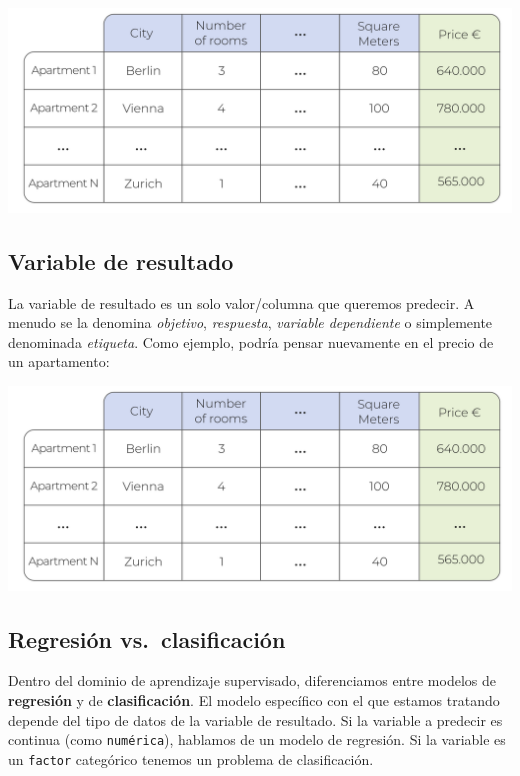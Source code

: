 \documentclass[
]{book}
\begin{document}
\includegraphics{img/tab1.png}

\hypertarget{variable-de-resultado}{%
\subsection{Variable de resultado}\label{variable-de-resultado}}

La variable de resultado es un solo valor/columna que queremos predecir. A menudo se la denomina \emph{objetivo}, \emph{respuesta}, \emph{variable dependiente} o simplemente denominada \emph{etiqueta}. Como ejemplo, podría pensar nuevamente en el precio de un apartamento:

\includegraphics{img/tab1.png}

\hypertarget{regresiuxf3n-vs.-clasificaciuxf3n}{%
\subsection{Regresión vs.~clasificación}\label{regresiuxf3n-vs.-clasificaciuxf3n}}

Dentro del dominio de aprendizaje supervisado, diferenciamos entre modelos de \textbf{regresión} y de \textbf{clasificación}. El modelo específico con el que estamos tratando depende del tipo de datos de la variable de resultado. Si la variable a predecir es continua (como \texttt{numérica}), hablamos de un modelo de regresión. Si la variable es un \texttt{factor} categórico tenemos un problema de clasificación.
\end{document}
